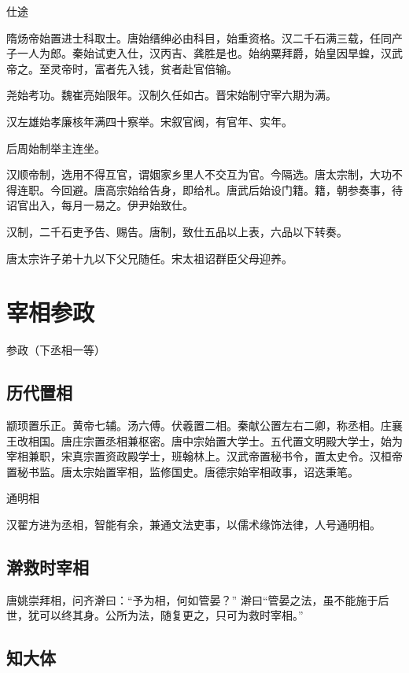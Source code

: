\documentclass[a4paper,12pt,UTF8,twoside]{ctexbook}
\begin{document}
    仕途
    
    隋炀帝始置进士科取士。唐始缙绅必由科目，始重资格。汉二千石满三载，任同产子一人为郎。秦始试吏入仕，汉丙吉、龚胜是也。始纳粟拜爵，始皇因旱蝗，汉武帝之。至灵帝时，富者先入钱，贫者赴官倍输。
    
    尧始考功。魏崔亮始限年。汉制久任如古。晋宋始制守宰六期为满。
    
    汉左雄始孝廉核年满四十察举。宋叙官阀，有官年、实年。
    
    后周始制举主连坐。
    
    汉顺帝制，选用不得互官，谓姻家乡里人不交互为官。今隔选。唐太宗制，大功不得连职。今回避。唐高宗始给告身，即给札。唐武后始设门籍。籍，朝参奏事，待诏官出入，每月一易之。伊尹始致仕。
    
    汉制，二千石吏予告、赐告。唐制，致仕五品以上表，六品以下转奏。
    
    唐太宗许子弟十九以下父兄随任。宋太祖诏群臣父母迎养。
    
    \chapter{宰相参政}
    
    参政（下丞相一等）
    
    \section{历代置相}
    
    颛顼置乐正。黄帝七辅。汤六傅。伏羲置二相。秦献公置左右二卿，称丞相。庄襄王改相国。唐庄宗置丞相兼枢密。唐中宗始置大学士。五代置文明殿大学士，始为宰相兼职，宋真宗置资政殿学士，班翰林上。汉武帝置秘书令，置太史令。汉桓帝置秘书监。唐太宗始置宰相，监修国史。唐德宗始宰相政事，诏迭秉笔。
    
    通明相
    
    汉翟方进为丞相，智能有余，兼通文法吏事，以儒术缘饰法律，人号通明相。
    
    \section{澣救时宰相}
    
    唐姚崇拜相，问齐澣曰：“予为相，何如管晏？” 澣曰“管晏之法，虽不能施于后世，犹可以终其身。公所为法，随复更之，只可为救时宰相。”
    
    \section{知大体}
    
\end{document}
